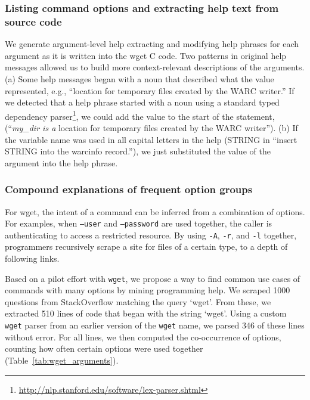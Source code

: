 \subsubsection{Listing command options and extracting help text from source code}

We generate argument-level help extracting and modifying help phrases for each argument as it is written into the wget C code.
Two patterns in original help messages allowed us to build more context-relevant descriptions of the arguments.
(a) Some help messages began with a noun that described what the value represented, e.g., ``location for temporary files created by the WARC writer.''
If we detected that a help phrase started with a noun using a standard typed dependency parser\footnote{\url{http://nlp.stanford.edu/software/lex-parser.shtml}}, we could add the value to the start of the statement, (``\emph{my\_dir is a} location for temporary files created by the WARC writer'').
(b) If the variable name was used in all capital letters in the help (STRING in ``insert STRING into the warcinfo record.''), we just substituted the value of the argument into the help phrase.

\subsubsection{Compound explanations of frequent option groups}

For wget, the intent of a command can be inferred from a combination of options.
For examples, when \texttt{--user} and \texttt{--password} are used together, the caller is authenticating to access a restricted resource.
By using \texttt{-A}, \texttt{-r}, and \texttt{-l} together, programmers recursively scrape a site for files of a certain type, to a depth of following links.

Based on a pilot effort with \texttt{wget}, we propose a way to find common use cases of commands with many options by mining programming help.
We scraped 1000 questions from StackOverflow matching the query `wget'.
From these, we extracted 510 lines of code that began with the string `wget'.
Using a custom \texttt{wget} parser from an earlier version of the \texttt{wget} \gls{name}, we parsed 346 of these lines without error.
For all lines, we then computed the co-occurrence of options, counting how often certain options were used together (Table~\ref{tab:wget_arguments}).

